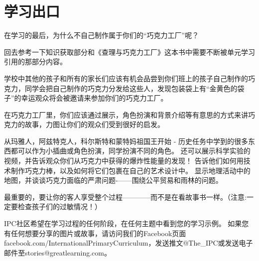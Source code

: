 \chapter{学习出口}

   在学习的最后，为什么不自己制作属于你们的“巧克力工厂”呢？\par
   回去参考一下知识获取部分和《查理与巧克力工厂》这本书中需要不断被单元学习引用的那部分内容。\par
   学校中其他的孩子和所有的家长们应该有机会品尝到你们班上的孩子自己制作的巧克力，同学会把自己制作的巧克力分发给这些人，发现包装袋上有“金黄色的袋子”的幸运观众将会被邀请来参加你们的巧克力工厂。\par
   在巧克力工厂里，你们应该通过展示，角色扮演和背景介绍等有意思的方式来讲巧克力的故事，力图让你们的观众们受到很好的启发。\par
   从玛雅人，阿兹特克人，科尔斯特和蒙特妈祖国王开始 - 历史任务中学到的很多东西都可以作为小插曲或角色扮演，同学扮演不同的角色。 还可以展示科学实验的视频，并告诉观众你们从巧克力中获得的爆炸性能量的发现！ 告诉他们如何用技术制作巧克力棒，以及如何将它们包裹在自己的艺术设计中。 显示地理活动中的地图，并谈谈巧克力面临的严肃问题-——围绕公平贸易和雨林的问题。\par
   最重要的，要让你的客人享受整个过程————而不是在看故事书一样。（注意:一定要检查孩子们的过敏情况！）\par
   IPC社区希望在学习过程的任何阶段，在任何主题中看到您的学习示例。 如果您有任何想要分享的图片或故事，请访问我们的Facebook页面facebook.com/InternationalPrimaryCurriculum，发送推文@The_IPC或发送电子邮件至stories@greatlearning.com。
